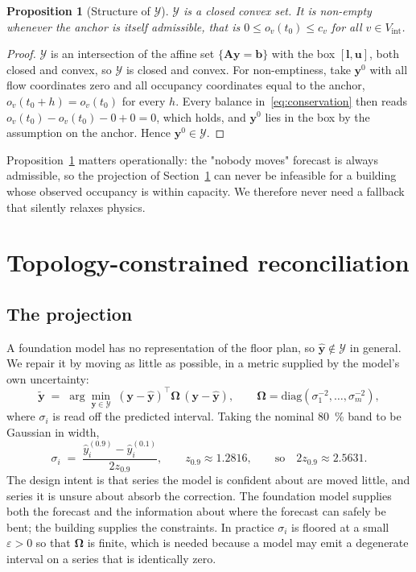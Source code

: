 \documentclass[11pt]{article}
\theoremstyle{plain}
\newtheorem{proposition}[theorem]{Proposition}
\theoremstyle{definition}
\theoremstyle{remark}
\newcommand{\bA}{\bm{A}}
\newcommand{\by}{\bm{y}}
\newcommand{\bb}{\bm{b}}
\newcommand{\bOm}{\bm{\Omega}}
\newcommand{\yhat}{\hat{\by}}
\newcommand{\ytil}{\tilde{\by}}
\newcommand{\cY}{\mathcal{Y}}
\begin{document}
\begin{proposition}[Structure of $\cY$]
\label{prop:convex}
$\cY$ is a closed convex set. It is non-empty whenever the anchor is itself admissible, that is $0 \le o_v(t_0) \le c_v$ for all $v \in V_{\mathrm{int}}$.
\end{proposition}
\begin{proof}
$\cY$ is an intersection of the affine set $\{\bA\by = \bb\}$ with the box $[\bm{l},\bm{u}]$, both closed and convex, so $\cY$ is closed and convex. For non-emptiness, take $\by^{0}$ with all flow coordinates zero and all occupancy coordinates equal to the anchor, $o_v(t_0+h) = o_v(t_0)$ for every $h$. Every balance in~\eqref{eq:conservation} then reads $o_v(t_0)-o_v(t_0)-0+0=0$, which holds, and $\by^{0}$ lies in the box by the assumption on the anchor. Hence $\by^{0} \in \cY$.
\end{proof}

Proposition~\ref{prop:convex} matters operationally: the "nobody moves" forecast is always admissible, so the projection of Section~\ref{sec:method} can never be infeasible for a building whose observed occupancy is within capacity. We therefore never need a fallback that silently relaxes physics.

\section{Topology-constrained reconciliation}
\label{sec:method}

\subsection{The projection}

A foundation model has no representation of the floor plan, so $\yhat \notin \cY$ in general. We repair it by moving as little as possible, in a metric supplied by the model's own uncertainty:
\begin{equation}
\ytil \;=\; \arg\min_{\by \in \cY} \; (\by - \yhat)^{\top} \bOm \, (\by - \yhat),
\qquad
\bOm = \mathrm{diag}\!\left(\sigma_1^{-2},\dots,\sigma_m^{-2}\right),
\label{eq:qp}
\end{equation}
where $\sigma_i$ is read off the predicted interval. Taking the nominal \SI{80}{\percent} band to be Gaussian in width,
\begin{equation}
\sigma_i \;=\; \frac{\hat{y}^{(0.9)}_i - \hat{y}^{(0.1)}_i}{2 z_{0.9}},
\qquad z_{0.9} \approx 1.2816,
\qquad \text{so} \quad 2 z_{0.9} \approx 2.5631 .
\label{eq:sigma}
\end{equation}
The design intent is that series the model is confident about are moved little, and series it is unsure about absorb the correction. The foundation model supplies both the forecast and the information about where the forecast can safely be bent; the building supplies the constraints. In practice $\sigma_i$ is floored at a small $\varepsilon>0$ so that $\bOm$ is finite, which is needed because a model may emit a degenerate interval on a series that is identically zero.
\end{document}
